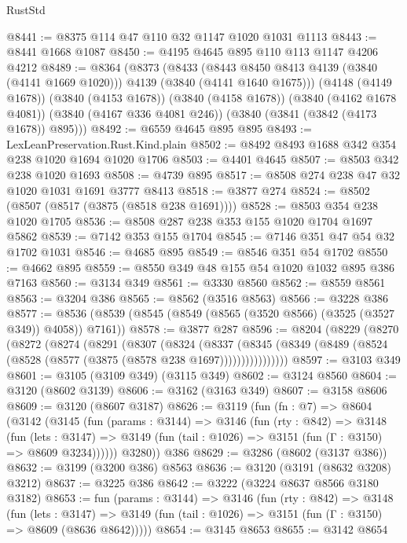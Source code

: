 \begin{lexlean}{RustStd}
\begin{coremodule}
{\begin{coremodule}
{{{{{{{{{{{{{{{{{{{{{{{{{{@8441 := @8375 @114 @47 @110 @32 @1147 @1020 @1031 @1113
@8443 := @8441 @1668 @1087
@8450 := @4195 @4645 @895 @110 @113 @1147 @4206 @4212
@8489 := @8364
    (@8373
      (@8433
        (@8443 @8450 @8413 @4139 (@3840 (@4141 @1669 @1020)))
        @4139
        (@3840 (@4141 @1640 @1675)))
      (@4148 (@4149 @1678))
      (@3840 (@4153 @1678))
      (@3840 (@4158 @1678))
      (@3840 (@4162 @1678 @4081))
      (@3840 (@4167 @336 @4081 @246))
      (@3840 (@3841 (@3842 (@4173 @1678)) @895)))
@8492 := @6559 @4645 @895 @895
@8493 := LexLeanPreservation.Rust.Kind.plain
@8502 := @8492 @8493 @1688 @342 @354 @238 @1020 @1694 @1020 @1706
@8503 := @4401 @4645
@8507 := @8503 @342 @238 @1020 @1693
@8508 := @4739 @895
@8517 := @8508 @274 @238 @47 @32 @1020 @1031 @1691 @3777 @8413
@8518 := @3877 @274
@8524 := @8502 (@8507 (@8517 (@3875 (@8518 @238 @1691))))
@8528 := @8503 @354 @238 @1020 @1705
@8536 := @8508 @287 @238 @353 @155 @1020 @1704 @1697 @5862
@8539 := @7142 @353 @155 @1704
@8545 := @7146 @351 @47 @54 @32 @1702 @1031
@8546 := @4685 @895
@8549 := @8546 @351 @54 @1702
@8550 := @4662 @895
@8559 := @8550 @349 @48 @155 @54 @1020 @1032 @895 @386 @7163
@8560 := @3134 @349
@8561 := @3330 @8560
@8562 := @8559 @8561
@8563 := @3204 @386
@8565 := @8562 (@3516 @8563)
@8566 := @3228 @386
@8577 := @8536 (@8539 (@8545 (@8549 (@8565 (@3520 @8566) (@3525 (@3527 @349)) @4058)) @7161))
@8578 := @3877 @287
@8596 := @8204
    (@8229
      (@8270
        (@8272
          (@8274
            (@8291
              (@8307
                (@8324
                  (@8337
                    (@8345
                      (@8349 (@8489 (@8524 (@8528 (@8577 (@3875 (@8578 @238 @1697))))))))))))))))
@8597 := @3103 @349
@8601 := @3105 (@3109 @349) (@3115 @349)
@8602 := @3124 @8560
@8604 := @3120 (@8602 @3139)
@8606 := @3162 (@3163 @349)
@8607 := @3158 @8606
@8609 := @3120 (@8607 @3187)
@8626 := @3119
    (fun (fn : @7) =>
    @8604
      (@3142
        (@3145
          (fun (params : @3144) =>
          @3146
            (fun (rty : @842) =>
            @3148
              (fun (lets : @3147) =>
              @3149 (fun (tail : @1026) => @3151 (fun (Γ : @3150) => @8609 @3234))))))
        @3280))
    @386
@8629 := @3286 (@8602 (@3137 @386))
@8632 := @3199 (@3200 @386) @8563
@8636 := @3120 (@3191 (@8632 @3208) @3212)
@8637 := @3225 @386
@8642 := @3222 (@3224 @8637 @8566 @3180 @3182)
@8653 := fun (params : @3144) =>
  @3146
    (fun (rty : @842) =>
    @3148
      (fun (lets : @3147) =>
      @3149 (fun (tail : @1026) => @3151 (fun (Γ : @3150) => @8609 (@8636 @8642)))))
@8654 := @3145 @8653
@8655 := @3142 @8654
}}}}}}}}}}}}}}}}}}}}}}}}}}
\end{coremodule}}
\end{coremodule}
\end{lexlean}
